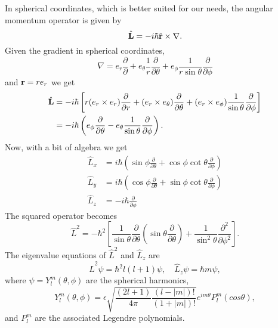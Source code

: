     In spherical coordinates, which is better suited for our needs, the angular 
    momentum operator is given by
    \begin{equation}
        \hat{\vb{L}} = -i\hbar \hat{\vb{r}} \times \nabla.
    \end{equation}
    Given the gradient in spherical coordinates,
    \begin{equation}
        \nabla = 
          e_r \frac{\partial}{\partial} 
        + e_\theta \frac{1}{r} \frac{\partial}{\partial \theta}
        + e_\phi \frac{1}{r\sin \theta} \frac{\partial}{\partial \phi}
    \end{equation}
    and $\vb{r} = re_r$ we get 
    \begin{equation}
        \begin{aligned}
        \hat{\vb{L}}
        &= 
        -i\hbar\left[ 
              r(e_r \times e_r)\frac{\partial}{\partial r} 
            + (e_r \times e_\theta)\frac{\partial}{\partial \theta}
            + (e_r \times e_\phi) \frac{1}{\sin\theta} \frac{\partial}{\partial \phi}  
        \right] \\
        &=
        -i\hbar \left( 
        e_\phi \frac{\partial}{\partial \theta}
        - e_\theta \frac{1}{\sin\theta}\frac{\partial}{\partial \phi}     
        \right).
        \end{aligned}
    \end{equation}
    Now, with a bit of algebra we get
    \begin{align}
        \hat{L}_x &= i\hbar \left(
            \sin\phi \frac{\partial}{\partial\theta}
            +\cos\phi\cot\theta\frac{\partial}{\partial \phi}
        \right) \\
        \hat{L}_y &= i\hbar \left(
            \cos\phi \frac{\partial}{\partial\theta}
            +\sin\phi\cot\theta\frac{\partial}{\partial \phi}
        \right) \\
        \hat{L}_z &= -i\hbar \frac{\partial}{\partial \phi}
    \end{align}
    The squared operator becomes
    \begin{equation}
        \hat{L}^2 = -\hbar^2 \left[
        \frac{1}{\sin\theta}\frac{\partial}{\partial\theta}
            \left(\sin\theta\frac{\partial}{\partial\theta} \right)
        + \frac{1}{\sin^2\theta}\frac{\partial^2}{\partial\phi^2}
        \right].
    \end{equation}
    The eigenvalue equations of $\hat{L}^2$ and $\hat{L}_z$ are
    \begin{equation}
        \hat{L}^2\psi = \hbar^2l(l + 1)\psi, \quad \hat{L}_z\psi = \hbar m \psi,
    \end{equation}
    where $\psi = Y^m_l(\theta, \phi)$ are the spherical harmonics,
    \begin{equation}
        Y^m_l (\theta, \phi) 
            = 
            \epsilon\sqrt{\frac{(2l + 1)}{4\pi}\frac{(l - |m|)!}{(1 + |m|)!}}
            e^{im\theta} P^m_l(cos\theta),
    \end{equation}
    and $P^m_l$ are the associated Legendre polynomials.


